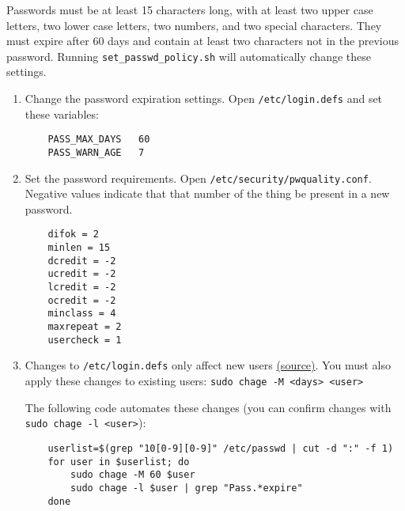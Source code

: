 Passwords must be at least 15 characters long, with at least two upper case letters, two lower case letters, two numbers, and two special characters. They must expire after 60 days and contain at least two characters not in the previous password. Running \texttt{set\_passwd\_policy.sh} will automatically change these settings.

\begin{enumerate}
  \item Change the password expiration settings. Open \texttt{/etc/login.defs} and set these variables:

	\begin{verbatim}
	PASS_MAX_DAYS   60
	PASS_WARN_AGE   7
	\end{verbatim}

  \item Set the password requirements. Open \texttt{/etc/security/pwquality.conf}. Negative values indicate that that number of the thing be present in a new password.

	\begin{verbatim}
	difok = 2
	minlen = 15
	dcredit = -2
	ucredit = -2
	lcredit = -2
	ocredit = -2
	minclass = 4
	maxrepeat = 2
	usercheck = 1
	\end{verbatim}

  \item Changes to \texttt{/etc/login.defs} only affect new users \href{https://www.server-world.info/en/note?os=Ubuntu_16.04&p=password}{(source)}. You must also apply these changes to existing users: \texttt{sudo chage -M <days> <user>}

    The following code automates these changes (you can confirm changes with \texttt{sudo chage -l <user>}):

	\begin{verbatim}
	userlist=$(grep "10[0-9][0-9]" /etc/passwd | cut -d ":" -f 1)
	for user in $userlist; do
	    sudo chage -M 60 $user
	    sudo chage -l $user | grep "Pass.*expire"
	done
	\end{verbatim}

\end{enumerate}
